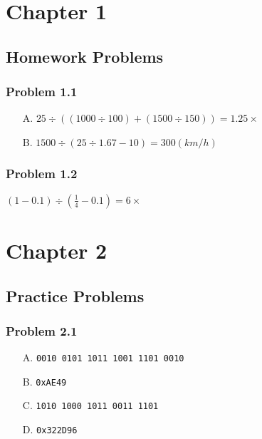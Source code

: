 \documentclass[a4paper]{article}
\begin{document}

\section*{Chapter 1}

\subsection*{Homework Problems}

\subsubsection*{Problem 1.1}
\begin{enumerate}
\item [A.] $25\div((1000\div100)+(1500\div150))=1.25\times$
\item [B.] $1500\div(25\div1.67-10)=300(km/h)$
\end{enumerate}

\subsubsection*{Problem 1.2}
$(1-0.1)\div(\frac{1}{4}-0.1)=6\times$


\section*{Chapter 2}

\subsection*{Practice Problems}

\subsubsection*{Problem 2.1}
\begin{enumerate}
    \item [A.] \texttt{0010 0101 1011 1001 1101 0010}
    \item [B.] \texttt{0xAE49}
    \item [C.] \texttt{1010 1000 1011 0011 1101}
    \item [D.] \texttt{0x322D96}
\end{enumerate}
\end{document}
